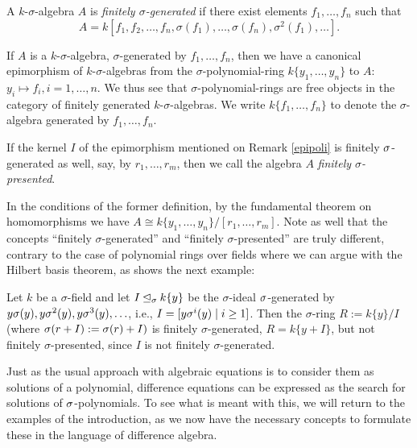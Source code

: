 \begin{defn}
A $k$-$\sigma$-algebra  $A$ is \emph{finitely $\sigma$-generated} if there exist elements $f_1, \ldots, f_n$ such that $$A = k[f_1,f_2,\ldots,f_n,\sigma(f_1),\ldots,\sigma(f_n),\sigma^2(f_1),\ldots].$$
\end{defn}

\begin{rem}\label{epipoli}
If $A$ is a $k$-$\sigma$-algebra, $\sigma$-generated by $f_1, \ldots, f_n$, then we have a canonical epimorphism of $k$-$\sigma$-algebras from the $\sigma$-polynomial-ring $k\{y_1, \ldots, y_n \}$ to $A$: $y_i \mapsto f_i, i = 1, \ldots, n$. We thus see that $\sigma$-polynomial-rings are free objects in the category of finitely generated $k$-$\sigma$-algebras. We write  $k\{f_1, \ldots, f_n\}$ to denote the  $\sigma$-algebra generated by $f_1, \ldots, f_n$.
\end{rem}

\begin{defn}
If the kernel $I$ of the epimorphism mentioned on Remark \ref{epipoli} is finitely $\sigma$-generated as well, say, by $r_1, \ldots, r_m$, then we call the algebra $A$ \emph{finitely $\sigma$-presented}. 
\end{defn}

\begin{rem}
In the conditions of the former definition, by the fundamental theorem on homomorphisms we have $A \cong k\{y_1, \ldots, y_n\}/[r_1,\ldots,r_m]$. Note as well that the concepts ``finitely $\sigma$-generated'' and ``finitely $\sigma$-presented'' are truly different, contrary to the case of polynomial rings over fields where we can argue with the Hilbert basis theorem, as shows the next example:
\end{rem}

\begin{ex}
Let $k$ be a $\sigma$-field and let $I \unlhd_{\sigma} k\{y\} $ be the $\sigma$-ideal $\sigma$-generated by $y\sigma(y), y\sigma^2(y), y\sigma^3(y), \ldots$, i.e., $I = [y \sigma^i(y) \mid i\geq 1]$. Then the $\sigma$-ring $R := k\{y\}/I$ (where $\sigma (r + I) := \sigma(r) + I)$ is 
finitely $\sigma$-generated, $R = k\{ y + I \}$, but not finitely $\sigma$-presented, since $I$ is not finitely $\sigma$-generated.
\end{ex}


Just as the usual approach with algebraic equations is to consider them as solutions of a polynomial, difference equations can be expressed as the search for solutions of $\sigma$-polynomials. To see what is meant with this, we will return to the examples of the introduction,
 as we now have the necessary concepts to formulate these in the language of difference algebra. 

